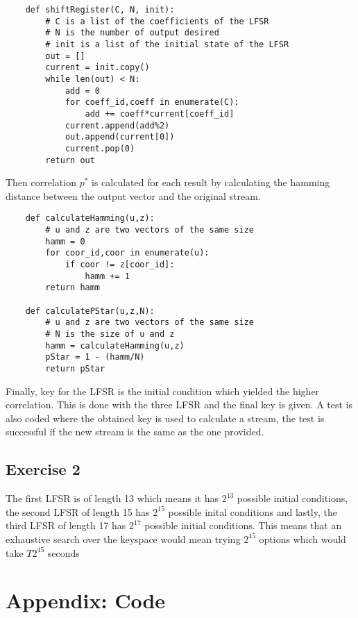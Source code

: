 \documentclass{article}
\begin{document}
\begin{verbatim}
    def shiftRegister(C, N, init):
        # C is a list of the coefficients of the LFSR
        # N is the number of output desired
        # init is a list of the initial state of the LFSR
        out = []
        current = init.copy()
        while len(out) < N:
            add = 0
            for coeff_id,coeff in enumerate(C):
                add += coeff*current[coeff_id]
            current.append(add%2)
            out.append(current[0])
            current.pop(0)
        return out
\end{verbatim}

Then correlation $p^*$ is calculated for each result by calculating the hamming distance between the output vector and the original stream.

\begin{verbatim}
    def calculateHamming(u,z):
        # u and z are two vectors of the same size
        hamm = 0
        for coor_id,coor in enumerate(u):
            if coor != z[coor_id]:
                hamm += 1
        return hamm

    def calculatePStar(u,z,N):
        # u and z are two vectors of the same size
        # N is the size of u and z
        hamm = calculateHamming(u,z)
        pStar = 1 - (hamm/N)
        return pStar
\end{verbatim}

Finally, key for the LFSR is the initial condition which yielded the higher correlation. This is done with the three LFSR and the final key is given. A test is also coded where the obtained key is used to calculate a stream, the test is successful if the new stream is the same as the one provided. 

\subsection{Exercise 2}

The first LFSR is of length 13 which means it has $2^{13}$ possible initial conditions, the second LFSR of length 15 has $2^{15}$ possible inital conditions and lastly, the third LFSR of length 17 has $2^{17}$ possible initial conditions. This means that an exhaustive search over the keyspace would mean trying $2^{45}$ options which would take $T2^{45}$ seconds


\section{Appendix: Code}
\end{document}
